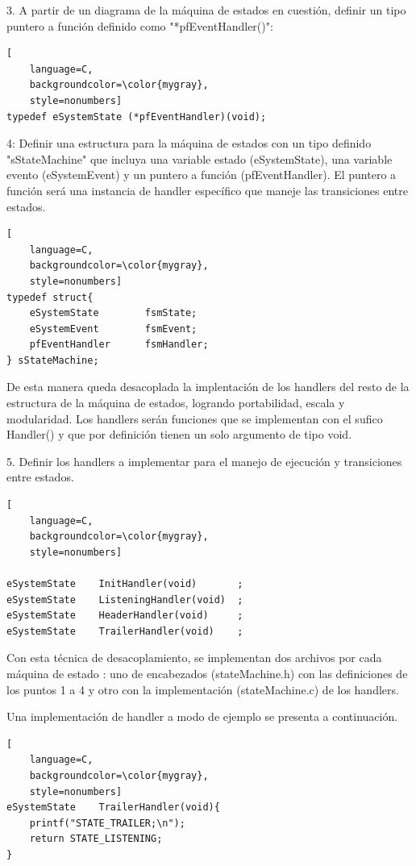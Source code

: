 3. A partir de un diagrama de la máquina de estados en cuestión, 
definir un tipo puntero a función definido como "*pfEventHandler()":

\begin{lstlisting}[
	language=C, 
	backgroundcolor=\color{mygray},
	style=nonumbers]
typedef eSystemState (*pfEventHandler)(void);
\end{lstlisting}

4: Definir una estructura para la máquina de estados con un tipo definido "sStateMachine" que incluya una variable estado (eSystemState), una variable evento (eSystemEvent) y un puntero a función (pfEventHandler). El puntero a función será una instancia de handler específico que maneje las transiciones entre estados. 

\begin{lstlisting}[
	language=C, 
	backgroundcolor=\color{mygray},
	style=nonumbers]
typedef struct{
	eSystemState 		fsmState;
	eSystemEvent 		fsmEvent;
	pfEventHandler 		fsmHandler;
} sStateMachine;
\end{lstlisting}

De esta manera queda desacoplada la implentación de los handlers del resto de la estructura de la máquina de estados, logrando portabilidad, escala y modularidad. Los handlers serán funciones que se implementan con el sufico Handler() y que por definición tienen un solo argumento de tipo void.

5. Definir los handlers a implementar para el manejo de ejecución y transiciones entre estados.

\begin{lstlisting}[
	language=C, 
	backgroundcolor=\color{mygray},
	style=nonumbers]

eSystemState 	InitHandler(void)		;
eSystemState 	ListeningHandler(void)	;
eSystemState 	HeaderHandler(void)		;
eSystemState 	TrailerHandler(void) 	;

\end{lstlisting}

Con esta técnica de desacoplamiento, se implementan dos archivos por cada máquina de estado : uno de encabezados (stateMachine.h) con las definiciones de los puntos 1 a 4 y otro con la implementación (stateMachine.c) de los handlers.

Una implementación de handler a modo de ejemplo se presenta a continuación.

\begin{lstlisting}[
	language=C, 
	backgroundcolor=\color{mygray},
	style=nonumbers]
eSystemState 	TrailerHandler(void){ 
	printf("STATE_TRAILER;\n");
	return STATE_LISTENING; 
}
\end{lstlisting}

